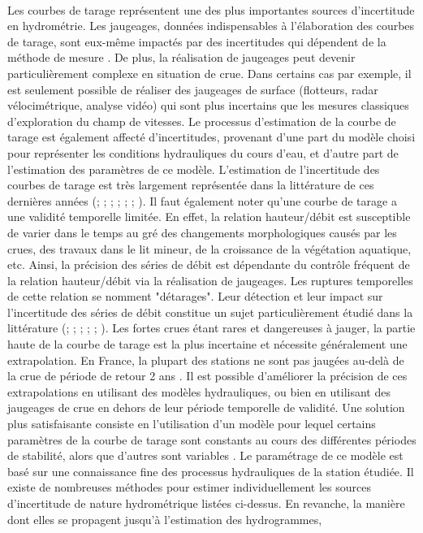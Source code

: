 	\paragraph{} Les courbes de tarage représentent une des plus importantes sources d'incertitude en hydrométrie. Les jaugeages, données indispensables à l'élaboration des courbes de tarage, sont eux-même impactés par des incertitudes qui dépendent de la méthode de mesure \citep{lecoz_quantification_2014}. De plus, la réalisation de jaugeages peut devenir particulièrement complexe en situation de crue. Dans certains cas par exemple, il est seulement possible de réaliser des jaugeages de surface (flotteurs, radar vélocimétrique, analyse vidéo) qui sont plus incertains que les mesures classiques d'exploration du champ de vitesses. Le processus d'estimation de la courbe de tarage est également affecté d'incertitudes, provenant d'une part du modèle choisi pour représenter les conditions hydrauliques du cours d'eau, et d'autre part de l'estimation des paramètres de ce modèle. L'estimation de l'incertitude des courbes de tarage est très largement représentée dans la littérature de ces dernières années (\cite{petersen-overleir_bayesian_2009}; \cite{juston_rating_2014}; \cite{le_coz_combining_2014}; \cite{morlot_dynamic_2014}; \cite{coxon_novel_2015}; \cite{mcmillan_rating_2015}; \cite{mansanarez_rapid_2019}). Il faut également noter qu'une courbe de tarage a une validité temporelle limitée. En effet, la relation hauteur/débit est susceptible de varier dans le temps au gré des changements morphologiques causés par les crues, des travaux dans le lit mineur, de la croissance de la végétation aquatique, etc. Ainsi, la précision des séries de débit est dépendante du contrôle fréquent de la relation hauteur/débit via la réalisation de jaugeages. Les ruptures temporelles de cette relation se nomment "détarages". Leur détection et leur impact sur l'incertitude des séries de débit constitue un sujet particulièrement étudié dans la littérature (\cite{mcmillan_impacts_2010}; \cite{westerberg_stage-discharge_2011}; \cite{guerrero_temporal_2012}; \cite{morlot_dynamic_2014}; \cite{lapuszek_methods_2015};  \cite{darienzo_detection_2021}). Les fortes crues étant rares et dangereuses à jauger, la partie haute de la courbe de tarage est la plus incertaine et nécessite généralement une extrapolation. En France, la plupart des stations ne sont pas jaugées au-delà de la crue de période de retour 2 ans \citep{lang_extrapolation_2010}. Il est possible d'améliorer la précision de ces extrapolations en utilisant des modèles hydrauliques, ou bien en utilisant des jaugeages de crue en dehors de leur période temporelle de validité. Une solution plus satisfaisante consiste en l'utilisation d'un modèle pour lequel certains paramètres de la courbe de tarage sont constants au cours des différentes périodes de stabilité, alors que d'autres sont variables \citep{mansanarez_shift_2019}. Le paramétrage de ce modèle est basé sur une connaissance fine des processus hydrauliques de la station étudiée. Il existe de nombreuses méthodes pour estimer individuellement les sources d'incertitude de nature hydrométrique listées ci-dessus. En revanche, la manière dont elles se propagent jusqu'à l'estimation des hydrogrammes, 